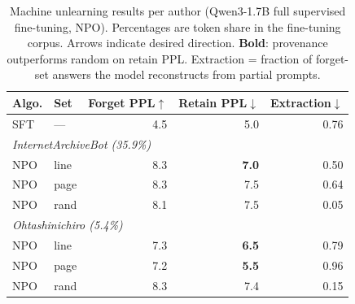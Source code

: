 \begin{table}[t]
	\centering
	\footnotesize
	\caption{Machine unlearning results per author (Qwen3-1.7B full supervised fine-tuning, NPO). Percentages are token share in the fine-tuning corpus. Arrows indicate desired direction. \textbf{Bold}: provenance outperforms random on retain PPL. Extraction = fraction of forget-set answers the model reconstructs from partial prompts.}
	\label{tab:mu-results}
	\setlength{\tabcolsep}{4pt}
	\begin{tabular}{@{}llrrr@{}}
		\toprule
		Algo. & Set & Forget PPL$\uparrow$ & Retain PPL$\downarrow$ & Extraction$\downarrow$ \\
		\midrule
		SFT & --- & 4.5 & 5.0 & 0.76 \\
		\midrule
		\multicolumn{5}{l}{\textit{InternetArchiveBot (35.9\%)}}\\
		NPO & line  & 8.3 & \textbf{7.0} & 0.50 \\
		NPO & page  & 8.3 & 7.5 & 0.64 \\
		NPO & rand  & 8.1 & 7.5 & 0.05 \\
		\midrule
		\multicolumn{5}{l}{\textit{Ohtashinichiro (5.4\%)}}\\
		NPO & line  & 7.3 & \textbf{6.5} & 0.79 \\
		NPO & page  & 7.2 & \textbf{5.5} & 0.96 \\
		NPO & rand  & 8.3 & 7.4 & 0.15 \\
		\bottomrule
	\end{tabular}
\end{table}